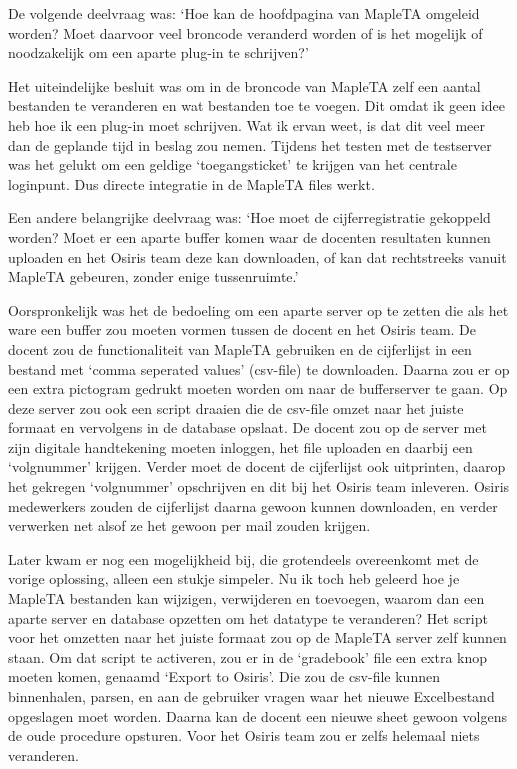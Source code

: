 
De volgende deelvraag was: `Hoe kan de hoofdpagina van MapleTA
omgeleid worden? Moet daarvoor veel broncode veranderd worden of is
het mogelijk of noodzakelijk om een aparte plug-in te schrijven?'

Het uiteindelijke besluit was om in de broncode van MapleTA zelf een
aantal bestanden te veranderen en wat bestanden toe te voegen. Dit omdat ik
geen idee heb hoe ik een plug-in moet schrijven. Wat ik ervan
weet, is dat dit veel meer dan de geplande tijd in beslag zou
nemen. Tijdens het testen met de testserver was het gelukt om een
geldige `toegangsticket' te krijgen van het centrale loginpunt. Dus
directe integratie in de MapleTA files werkt.


Een andere belangrijke deelvraag was: `Hoe moet de cijferregistratie
gekoppeld worden? Moet er een aparte buffer komen waar de docenten
resultaten kunnen uploaden en het Osiris team deze kan downloaden, of
kan dat rechtstreeks vanuit MapleTA gebeuren, zonder enige
tussenruimte.'

Oorspronkelijk was het de bedoeling om een aparte server op te zetten
die als het ware een buffer zou moeten vormen tussen de docent en het
Osiris team. De docent zou de functionaliteit van MapleTA gebruiken en
de cijferlijst in een bestand met `comma seperated values' (csv-file)
te downloaden. Daarna zou er op een extra pictogram gedrukt moeten
worden om naar de bufferserver te gaan. Op deze server zou ook een
script draaien die de csv-file omzet naar het juiste formaat en
vervolgens in de database opslaat. De docent zou op de server met zijn
digitale handtekening moeten inloggen, het file uploaden en daarbij
een `volgnummer' krijgen. Verder moet de docent de cijferlijst ook
uitprinten, daarop het gekregen `volgnummer' opschrijven en dit bij
het Osiris team inleveren. Osiris medewerkers zouden de cijferlijst
daarna gewoon kunnen downloaden, en verder verwerken net alsof ze het
gewoon per mail zouden krijgen.

Later kwam er nog een mogelijkheid bij, die grotendeels overeenkomt
met de vorige oplossing, alleen een stukje simpeler. Nu ik toch heb
geleerd hoe je MapleTA bestanden kan wijzigen, verwijderen en
toevoegen, waarom dan een aparte server en database opzetten om het
datatype te veranderen? Het script voor het omzetten naar het juiste
formaat zou op de MapleTA server zelf kunnen staan. Om dat script te
activeren, zou er in de `gradebook' file een extra knop moeten komen,
genaamd `Export to Osiris'. Die zou de csv-file kunnen binnenhalen,
parsen, en aan de gebruiker vragen waar het nieuwe Excelbestand
opgeslagen moet worden. Daarna kan de docent een nieuwe sheet gewoon
volgens de oude procedure opsturen. Voor het Osiris team zou er zelfs
helemaal niets veranderen.

